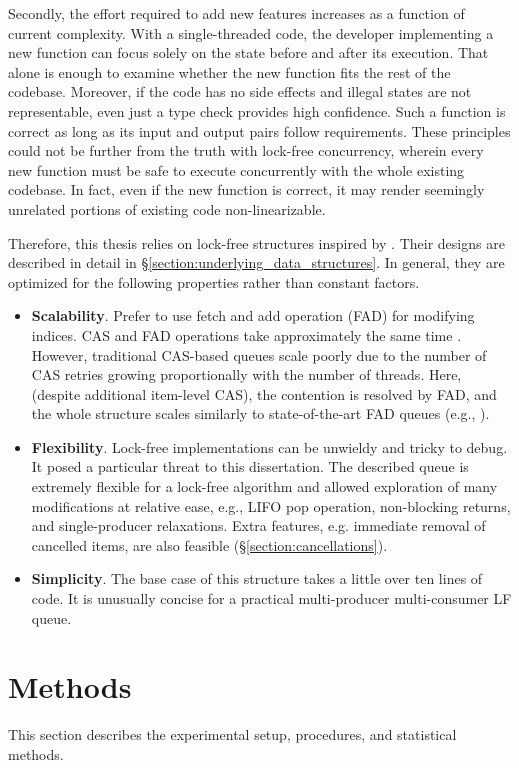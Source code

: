 \documentclass[12pt,a4paper,twoside]{report}
\begin{document}
Secondly, the effort required to add new features increases as a function of current complexity. With a single-threaded code, the developer implementing a new function can focus solely on the state before and after its execution. That alone is enough to examine whether the new function fits the rest of the codebase. Moreover, if the code has no side effects and illegal states are not representable, even just a type check provides high confidence. Such a function is correct as long as its input and output pairs follow requirements. These principles could not be further from the truth with lock-free concurrency, wherein every new function must be safe to execute concurrently with the whole existing codebase. In fact, even if the new function is correct, it may render seemingly unrelated portions of existing code non-linearizable. 


Therefore, this thesis relies on lock-free structures inspired by \citet{Kappes2021}. Their designs are described in detail in \S\ref{section:underlying_data_structures}. In general, they are optimized for the following properties rather than constant factors.  
\begin{itemize}
    \item \textbf{Scalability}. Prefer to use fetch and add operation (FAD) for modifying indices. CAS and FAD operations take approximately the same time \cite{fad-cas-speed}. However, traditional CAS-based queues scale poorly due to the number of CAS retries growing proportionally with the number of threads. Here, (despite additional item-level CAS), the contention is resolved by FAD, and the whole structure scales similarly to state-of-the-art FAD queues (e.g., \cite{Yang2016}).
    \item \textbf{Flexibility}. Lock-free implementations can be unwieldy and tricky to debug. It posed a particular threat to this dissertation. The described queue is extremely flexible for a lock-free algorithm and allowed exploration of many modifications at relative ease, e.g., LIFO pop operation, non-blocking returns, and single-producer relaxations. Extra features, e.g. immediate removal of cancelled items, are also feasible (\S\ref{section:cancellations}).
    \item \textbf{Simplicity}. The base case of this structure takes a little over ten lines of code. It is unusually concise for a practical multi-producer multi-consumer LF queue. 
\end{itemize}


\section{Methods}
\label{section:methods}
This section describes the experimental setup, procedures, and statistical methods.
\end{document}

